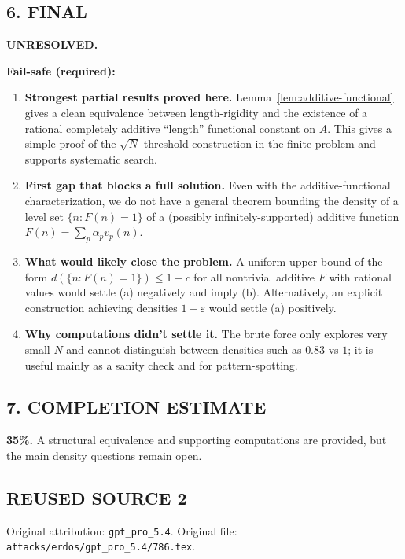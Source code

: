 \subsection*{6. FINAL}
\textbf{UNRESOLVED.}

\medskip
\noindent\textbf{Fail-safe (required):}
\begin{enumerate}[leftmargin=2em,label=(\roman*)]
\item \textbf{Strongest partial results proved here.}
Lemma~\ref{lem:additive-functional} gives a clean equivalence between length-rigidity and the existence of a rational completely additive ``length'' functional constant on $A$. This gives a simple proof of the $\sqrt N$-threshold construction in the finite problem and supports systematic search.
\item \textbf{First gap that blocks a full solution.}
Even with the additive-functional characterization, we do not have a general theorem bounding the density of a level set $\{n: F(n)=1\}$ of a (possibly infinitely-supported) additive function $F(n)=\sum_p \alpha_p v_p(n)$.
\item \textbf{What would likely close the problem.}
A uniform upper bound of the form $d(\{n: F(n)=1\})\le 1-c$ for all nontrivial additive $F$ with rational values would settle (a) negatively and imply (b). Alternatively, an explicit construction achieving densities $1-\varepsilon$ would settle (a) positively.
\item \textbf{Why computations didn't settle it.}
The brute force only explores very small $N$ and cannot distinguish between densities such as $0.83$ vs $1$; it is useful mainly as a sanity check and for pattern-spotting.
\end{enumerate}

\subsection*{7. COMPLETION ESTIMATE}
\textbf{35\%.} A structural equivalence and supporting computations are provided, but the main density questions remain open.



\subsection*{REUSED SOURCE 2}
Original attribution: \texttt{gpt\_pro\_5.4}.
Original file: \texttt{attacks/erdos/gpt\_pro\_5.4/786.tex}.

